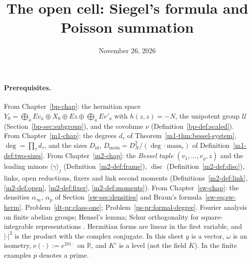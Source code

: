 \documentclass[reqno]{amsart}
\title{The open cell: Siegel's formula and Poisson summation}
\author{}
\date{November 26, 2026}
\newcounter{chap}
\theoremstyle{definition}
\theoremstyle{plain}
\theoremstyle{remark}
\newcommand{\R}{\mathbb{R}}
\newcommand{\ii}{\mathrm{i}}
\newcommand{\Uc}{\mathcal{U}}
\newcommand{\disc}{\operatorname{disc}}
\newcommand{\Dm}{D_{\mathrm{main}}}
\newcommand{\Di}{D_{\mathrm{id}}}
\begin{document}
\maketitle
{}\label{chap}

\paragraph{Prerequisites.}
From Chapter~\ref{bp-chap}: the hermitian space \(Y_0=\bigoplus_aEv_a\oplus X_0\oplus Ez\oplus\bigoplus_aEv'_a\) with \(h(z,z)=-N\), the unipotent group \(\Uc\) (Section~\ref{bp-sec:subgroup}), and the covolume \(\nu\) (Definition~\ref{bp-def:scaled}).  From Chapter~\ref{m1-chap}: the degrees \(d_\tau\) of Theorem~\ref{m1-thm:bessel-system}, \(\deg=\prod_\tau d_\tau\), and the sizes \(\Di\), \(\Dm=D_X^2/(\deg\cdot\mathrm{mass}_r)\) of Definition~\ref{m1-def:two-sizes}.  From Chapter~\ref{m2-chap}: the \emph{Bessel tuple} \((v_1,\dots,v_\varrho,z)\) and the leading minors \(\langle\gamma\rangle_j\) (Definition~\ref{m2-def:frame}), \(\disc\) (Definition~\ref{m2-def:disc}), links, open reductions, fixers and link second moments (Definitions~\ref{m2-def:link}, \ref{m2-def:open}, \ref{m2-def:fixer}, \ref{m2-def:moments}).  From Chapter~\ref{sw-chap}: the densities \(\alpha_\infty\), \(\alpha_p\) of Section~\ref{sw-sec:densities} and Braun's formula~\eqref{sw-eq:sw-herm}.  Problem~\ref{dt-pr:class-one}; Problem~\ref{ps-pr:formal-degree}.  Fourier analysis on finite abelian groups; Hensel's lemma; Schur orthogonality for square-integrable representations \cite[Ch.~IX]{Kn}.  Hermitian forms are linear in the first variable, and \(\lvert\cdot\rvert^2\) is the product with the complex conjugate.  In this sheet \(y\) is a vector, \(\omega\) is an isometry, \(\mathrm e(\cdot):=e^{2\pi\ii\,\cdot}\) on \(\R\), and \(K'\) is a level (not the field \(K\)).  In the finite examples \(p\) denotes a prime.
\end{document}
